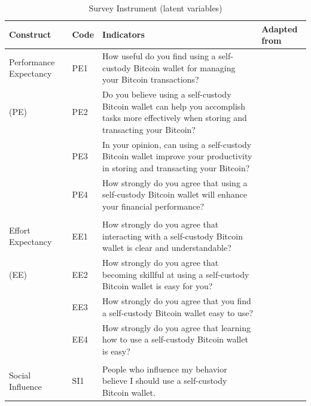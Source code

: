 \documentclass[twocolumn]{article}
\begin{document}
\begin{table}[pb]
\centering
\small
\caption{Survey Instrument (latent variables)}
\label{tab:survey_instrument}
\begin{tabular}{@{}p{1.7cm}p{0.7cm}p{10cm}p{3.8cm}@{}} 
\toprule
\textbf{Construct}                        & \textbf{Code} & \textbf{Indicators} & \textbf{Adapted from} \\ \midrule
Performance Expectancy                    & PE1           & How useful do you find using a self-custody Bitcoin wallet for managing your Bitcoin transactions? & \textcite{venkatesh_user_2003, venkatesh_consumer_2012} \\  (PE)
                                          & PE2           & Do you believe using a self-custody Bitcoin wallet can help you accomplish tasks more effectively when storing and transacting your Bitcoin? & \textcite{queiroz_blockchain_2019} \\
                                          & PE3           & In your opinion, can using a self-custody Bitcoin wallet improve your productivity in storing and transacting your Bitcoin? &  \\
                                          & PE4           & How strongly do you agree that using a self-custody Bitcoin wallet will enhance your financial performance? &  \\
\\Effort Expectancy                       & EE1           & How strongly do you agree that interacting with a self-custody Bitcoin wallet is clear and understandable? & \textcite{venkatesh_user_2003, venkatesh_consumer_2012} \\
(EE)                                      & EE2           & How strongly do you agree that becoming skillful at using a self-custody Bitcoin wallet is easy for you? & \textcite{wong_unearthing_2020} \\
                                          & EE3           & How strongly do you agree that you find a self-custody Bitcoin wallet easy to use? &  \\
                                          & EE4           & How strongly do you agree that learning how to use a self-custody Bitcoin wallet is easy? &  \\
\\Social Influence                        & SI1           & People who influence my behavior believe I should use a self-custody Bitcoin wallet. & \textcite{albayati_accepting_2020} \textcite{venkatesh_user_2003} \\

\end{tabular}
\end{table}
\end{document}
